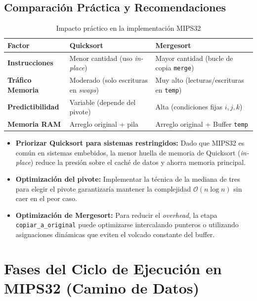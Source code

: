 \documentclass[12pt,a4paper]{article}
\begin{document}
	\subsection{Comparación Práctica y Recomendaciones}
	\begin{table}[h!]
		\centering
		\caption{Impacto práctico en la implementación MIPS32}
		\vspace{0.2cm}
		\begin{tabularx}{\textwidth}{l | X | X}
			\toprule
			\textbf{Factor} & \textbf{Quicksort} & \textbf{Mergesort} \\
			\midrule
			\textbf{Instrucciones} & Menor cantidad (uso \textit{in-place}) & Mayor cantidad (bucle de copia \texttt{merge}) \\
			\midrule
			\textbf{Tráfico Memoria} & Moderado (solo escrituras en \textit{swaps}) & Muy alto (lecturas/escrituras en \texttt{temp}) \\
			\midrule
			\textbf{Predictibilidad} & Variable (depende del pivote) & Alta (condiciones fijas $i, j, k$) \\
			\midrule
			\textbf{Memoria RAM} & Arreglo original + pila & Arreglo original + Buffer \texttt{temp} \\
			\bottomrule
		\end{tabularx}
	\end{table}
	
	\begin{itemize}
		\item \textbf{Priorizar Quicksort para sistemas restringidos:} Dado que MIPS32 es común en sistemas embebidos, la menor huella de memoria de Quicksort (\textit{in-place}) reduce la presión sobre el caché de datos y ahorra memoria principal.
		\item \textbf{Optimización del pivote:} Implementar la técnica de la mediana de tres para elegir el pivote garantizaría mantener la complejidad $\mathcal{O}(n \log n)$ sin caer en el peor caso.
		\item \textbf{Optimización de Mergesort:} Para reducir el \textit{overhead}, la etapa \texttt{copiar\_a\_original} puede optimizarse intercalando punteros o utilizando asignaciones dinámicas que eviten el volcado constante del buffer.
	\end{itemize}
	
	
	\section{Fases del Ciclo de Ejecución en MIPS32 (Camino de Datos)}
	
\end{document}
